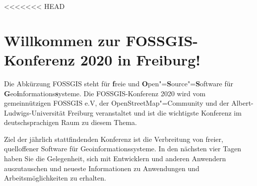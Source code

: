 \newpage
<<<<<<< HEAD
\section*{Willkommen zur FOSSGIS-Konferenz 2020 in Freiburg!} \label{welcome}
Die Abkürzung { FOSSGIS} steht für {\bf f}reie und {\bf O}pen"={\bf S}ource"={\bf S}oftware für {\bfseries G}eo{\bf i}nformations{\bfseries s}ysteme.
Die FOSSGIS-Konferenz 2020 wird vom gemeinnützigen FOSSGIS e.V, der
OpenStreetMap"=Community und der Albert-Ludwigs-Universität Freiburg
veranstaltet und ist die wichtigste Konferenz im deutschsprachigen Raum zu
diesem Thema.

Ziel der jährlich stattfindenden Konferenz ist die Verbreitung von freier,
quelloffener Software für Geoinformationssysteme. In den nächsten vier Tagen
haben Sie die Gelegenheit, sich mit Entwicklern und anderen Anwendern
auszutauschen und \mbox{neueste} Informationen zu Anwendungen und
Arbeitsmöglichkeiten zu erhalten.

\newpage
